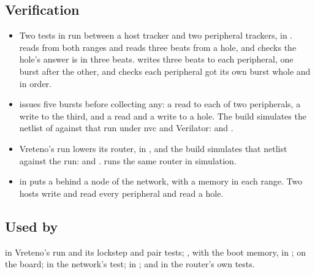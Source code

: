 \subsection*{Verification}

\begin{itemize}
\item Two tests in  run  between a host tracker and two peripheral trackers, in
. 
reads from both ranges and reads three beats from a hole, and checks
the hole's answer is  in three beats.
 writes three beats to each
peripheral, one burst after the other, and checks each peripheral got
its own burst whole and in order.
\item {} issues five bursts before collecting any:
a read to each of two peripherals, a write to the third, and a read and
a write to a hole. The build simulates the netlist of  against that run under nvc and Verilator:
 and
.
\item Vreteno's run lowers its router,  in , and the build simulates that
netlist against the run: 
and .
 runs the same router in simulation.
\item {} in  puts
a  behind a node of the network, with a
memory in each range. Two hosts write and read every peripheral and
read a hole.
\end{itemize}

\subsection*{Used by}

 in Vreteno's run and its lockstep and
pair tests; , with the boot memory, in
;  on the
board;  in the network's test;
 in ; and
 in the router's own tests.

